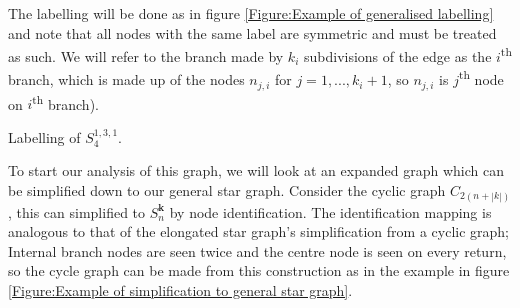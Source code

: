 \documentclass[a4paper,10pt]{article}
\theoremstyle{definition}
\theoremstyle{definition}
\theoremstyle{remark}
\theoremstyle{definition}
\begin{document}
The labelling will be done as in figure \ref{Figure:Example of generalised labelling} and note that all nodes with the same label are symmetric and must be treated as such. We will refer to the branch made by $k_{i}$ subdivisions of the edge as the $i$\textsuperscript{th} branch, which is made up of the nodes $n_{j,i}$ for $j=1,...,k_{i}+1$, so $n_{j,i}$ is $j$\textsuperscript{th} node on $i$\textsuperscript{th} branch).

\begin{myfigure}
\begin{center}
\end{center}
\caption{Labelling of $S^{1,3,1}_{4}$.}
\label{Figure:Example of generalised labelling}
\end{myfigure}

To start our analysis of this graph, we will look at an expanded graph which can be simplified down to our general star graph. Consider the cyclic graph $C_{2(n+|k|)}$, this can simplified to $S^{\bm{k}}_{n}$ by node identification. The identification mapping is analogous to that of the elongated star graph's simplification from a cyclic graph; Internal branch nodes are seen twice and the centre node is seen on every return, so the cycle graph can be made from this construction as in the example in figure \ref{Figure:Example of simplification to general star graph}.
\end{document}

